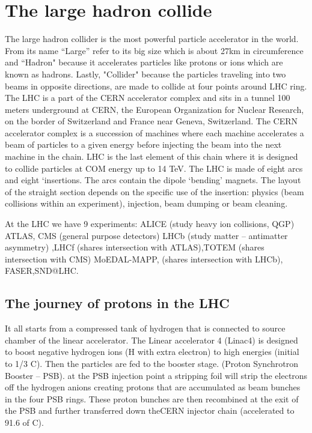 \section{The large hadron collide}
The large hadron collider is the most powerful particle accelerator in the world. From its name “Large” refer to its big size which is about 27km in circumference and “Hadron" because it accelerates particles like protons or ions which are known as hadrons.
Lastly, "Collider" because the particles traveling into two beams in opposite directions, are made to collide at four points around LHC ring.
The LHC is a part of the CERN accelerator complex and sits in a tunnel 100 meters underground at CERN, the European Organization for Nuclear Research, on the border of Switzerland and France near Geneva, Switzerland.
The CERN accelerator complex is a succession of machines where each machine accelerates a beam of particles to a given energy before injecting the beam into the next machine in the chain. LHC is the last element of this chain where it is designed to collide particles at COM energy up to 14 TeV.
The LHC is made of eight arcs and eight ‘insertions. The arcs contain the dipole ‘bending’ magnets. The layout of the straight section depends on the specific use of the insertion: physics (beam collisions within an experiment), injection, beam dumping or beam cleaning.

At the LHC we have 9 experiments:
ALICE (study heavy ion collisions, QGP) ATLAS, CMS  (general purpose detectors) LHCb (study matter – antimatter asymmetry) ,LHCf (shares intersection with ATLAS),TOTEM (shares intersection with CMS) MoEDAL-MAPP, (shares intersection with LHCb), FASER,SND@LHC.

\subsection{The journey of protons in the LHC}

It all starts from a compressed tank of hydrogen that is connected to source chamber of the linear accelerator.
The Linear accelerator 4 (Linac4) is designed to boost negative hydrogen ions (H with extra electron) to high energies (initial to 1/3 C).
Then the particles are fed to the booster stage. (Proton Synchrotron Booster – PSB).
at the PSB injection point a stripping foil will strip the electrons off the hydrogen anions creating protons that are accumulated as beam bunches in the four PSB rings.
These proton bunches are then recombined at the exit of the PSB and further transferred down theCERN injector chain (accelerated to 91.6 of C).

